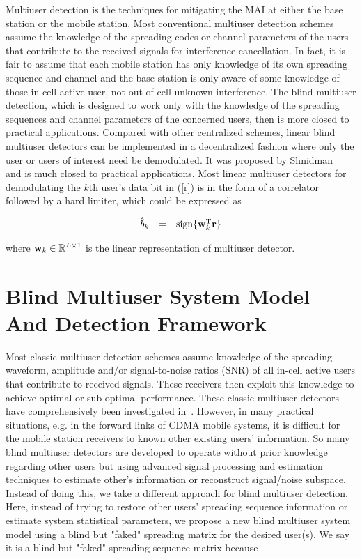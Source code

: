 \documentclass[a4paper,11pt,fleqn]{article}
\newcommand{\br}{{\mathbf r}}
\newcommand{\bw}{{\bf w}}
\begin{document}
Multiuser detection is the techniques for mitigating the MAI at
either the base station or the mobile station. Most conventional
multiuser detection schemes assume the knowledge of the spreading
codes or channel parameters of the users that contribute to the
received signals for interference cancellation. In fact, it is
fair to assume that each mobile station has only knowledge of its
own spreading sequence and channel and the base station is only
aware of some knowledge of those in-cell active user, not
out-of-cell unknown interference. The blind multiuser detection,
which is designed to work only with the knowledge of the spreading
sequences and channel parameters of the concerned users, then is
more closed to practical applications. Compared with other
centralized schemes, linear blind multiuser detectors can be
implemented in a decentralized fashion where only the user or
users of interest need be demodulated. It was proposed by
Shnidman~\cite{Shni67} and is much closed to practical
applications. Most linear multiuser detectors for demodulating the
$k$th user's data bit in (\ref{r}) is in the form of a correlator
followed by a hard limiter, which could be expressed as

\begin{equation}
\begin{array}{rcl}
\hat{b}_k &=& \mbox{sign}\{\bw_k^{\rm T}\br\}
\end{array} \label{linear}
\end{equation}

\noindent where $\bw_k \in \mathbb{R}^{L\times 1}$ is the linear
representation of multiuser detector.

\pagebreak

\section{Blind Multiuser System Model And Detection Framework\label{BMUD_model}}

Most classic multiuser detection schemes assume knowledge of the
spreading waveform, amplitude and/or signal-to-noise ratios (SNR)
of all in-cell active users that contribute to received signals.
These receivers then exploit this knowledge to achieve optimal or
sub-optimal performance. These classic multiuser detectors have
comprehensively been investigated in~\cite{Verd98}. However, in
many practical situations, e.g. in the forward links of CDMA
mobile systems, it is difficult for the mobile station receivers
to known other existing users' information. So many blind
multiuser detectors are developed to operate without prior
knowledge regarding other users but using advanced signal
processing and estimation techniques to estimate other's
information or reconstruct signal/noise subspace. Instead of doing
this, we take a different approach for blind multiuser detection.
Here, instead of trying to restore other users' spreading sequence
information or estimate system statistical parameters, we propose
a new blind multiuser system model using a blind but "faked"
spreading matrix for the desired user(s). We say it is a blind but
"faked" spreading sequence matrix because
\end{document}
